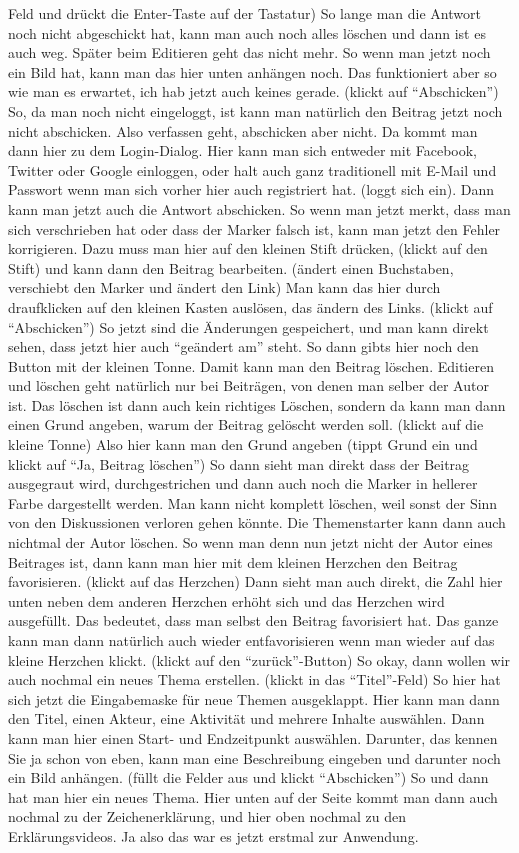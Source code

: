 \begin{itemize}
Feld und dr{\"u}ckt die Enter-Taste auf der Tastatur) So lange man die Antwort noch nicht abgeschickt hat, kann man auch noch alles l{\"o}schen und dann ist es auch weg. Sp{\"a}ter beim Editieren geht das nicht mehr. So wenn man jetzt noch ein Bild hat, kann man das hier unten anh{\"a}ngen noch. Das funktioniert aber so wie man es erwartet, ich hab jetzt auch keines gerade. (klickt auf "`Abschicken"') So, da man noch nicht eingeloggt, ist kann man nat{\"u}rlich den Beitrag jetzt noch nicht abschicken. Also verfassen geht, abschicken aber nicht. Da kommt man dann hier zu dem Login-Dialog. Hier kann man sich entweder mit Facebook, Twitter oder Google einloggen, oder halt auch ganz traditionell mit E-Mail und Passwort wenn man sich vorher hier auch registriert hat. (loggt sich ein). Dann kann man jetzt auch die Antwort abschicken. So wenn man jetzt merkt, dass man sich verschrieben hat oder dass der Marker falsch ist, kann man jetzt den Fehler korrigieren. Dazu muss man hier auf den kleinen Stift dr{\"u}cken, (klickt auf den Stift) und kann dann den Beitrag bearbeiten. ({\"a}ndert einen Buchstaben, verschiebt den Marker und {\"a}ndert den Link) Man kann das hier durch draufklicken auf den kleinen Kasten ausl{\"o}sen, das {\"a}ndern des Links. (klickt auf "`Abschicken"') So jetzt sind die {\"A}nderungen gespeichert, und man kann direkt sehen, dass jetzt hier auch "`ge{\"a}ndert am"' steht. So dann gibts hier noch den Button mit der kleinen Tonne. Damit kann man den Beitrag l{\"o}schen. Editieren und l{\"o}schen geht nat{\"u}rlich nur bei Beitr{\"a}gen, von denen man selber der Autor ist. Das l{\"o}schen ist dann auch kein richtiges L{\"o}schen, sondern da kann man dann einen Grund angeben, warum der Beitrag gel{\"o}scht werden soll. (klickt auf die kleine Tonne) Also hier kann man den Grund angeben (tippt Grund ein und klickt auf "`Ja, Beitrag l{\"o}schen"') So dann sieht man direkt dass der Beitrag ausgegraut wird, durchgestrichen und dann auch noch die Marker in hellerer Farbe dargestellt werden. Man kann nicht komplett l{\"o}schen, weil sonst der Sinn von den Diskussionen verloren gehen k{\"o}nnte. Die Themenstarter kann dann auch nichtmal der Autor l{\"o}schen. So wenn man denn nun jetzt nicht der Autor eines Beitrages ist, dann kann man hier mit dem kleinen Herzchen den Beitrag favorisieren. (klickt auf das Herzchen) Dann sieht man auch direkt, die Zahl hier unten neben dem anderen Herzchen erh{\"o}ht sich und das Herzchen wird ausgef{\"u}llt. Das bedeutet, dass man selbst den Beitrag favorisiert hat. Das ganze kann man dann nat{\"u}rlich auch wieder entfavorisieren wenn man wieder auf das kleine Herzchen klickt. (klickt auf den "`zur{\"u}ck"'-Button) So okay, dann wollen wir auch nochmal ein neues Thema erstellen. (klickt in das "`Titel"'-Feld) So hier hat sich jetzt die Eingabemaske f{\"u}r neue Themen ausgeklappt. Hier kann man dann den Titel, einen Akteur, eine Aktivit{\"a}t und mehrere Inhalte ausw{\"a}hlen. Dann kann man hier einen Start- und Endzeitpunkt ausw{\"a}hlen.  Darunter, das kennen Sie ja schon von eben, kann man eine Beschreibung eingeben und darunter noch ein Bild anh{\"a}ngen. (f{\"u}llt die Felder aus und klickt "`Abschicken"') So und dann hat man hier ein neues Thema. Hier unten auf der Seite kommt man dann auch nochmal zu der Zeichenerkl{\"a}rung, und hier oben nochmal zu den Erkl{\"a}rungsvideos. Ja also das war es jetzt erstmal zur Anwendung.
\end{itemize}